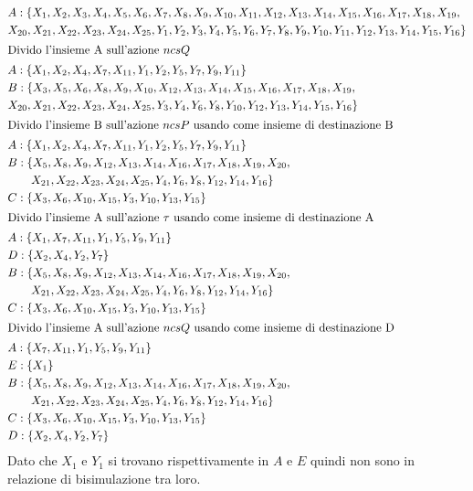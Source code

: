 \documentclass[a4paper]{article}
\begin{document}
\begin{align*}
	&A : \{X_1,X_2,X_3,X_4,X_5,X_6,X_7,X_8,X_9,X_{10},X_{11},X_{12},X_{13},X_{14},X_{15},X_{16},X_{17},X_{18},X_{19},
     \\ &X_{20},X_{21},X_{22},X_{23},X_{24},X_{25},Y_1,Y_2,Y_3,Y_4,Y_5,Y_6,Y_7,Y_8,Y_9,Y_{10},Y_{11},Y_{12},Y_{13},Y_{14},Y_{15},Y_{16}\}\\
     \intertext{Divido l'insieme A sull'azione $ncsQ$}
	&A: \{X_1,X_2,X_4,X_7,X_{11},Y_1,Y_2,Y_5,Y_7,Y_9,Y_{11}\}\\
	&B: \{X_3,X_5,X_6,X_8,X_9,X_{10},X_{12},X_{13},X_{14},X_{15},X_{16},X_{17},X_{18},X_{19},\\&X_{20},X_{21},X_{22},X_{23},X_{24},X_{25},Y_3,Y_4,Y_6,Y_8,Y_{10},Y_{12},Y_{13},Y_{14},Y_{15},Y_{16}\}\\
     \intertext{Divido l'insieme B sull'azione $ncsP$ usando come insieme di destinazione B}
	&A: \{X_1,X_2,X_4,X_7,X_{11},Y_1,Y_2,Y_5,Y_7,Y_9,Y_{11}\}\\
	&B: \{X_5,X_8,X_9,X_{12},X_{13},X_{14},X_{16},X_{17},X_{18},X_{19},X_{20},\\& \qquad X_{21},X_{22},X_{23},X_{24},X_{25},Y_4,Y_6,Y_8,Y_{12},Y_{14},Y_{16}\}\\
	&C: \{X_3,X_6,X_{10},X_{15},Y_3,Y_{10},Y_{13},Y_{15} \}\\
     \intertext{Divido l'insieme A sull'azione $\tau$ usando come insieme di destinazione A}
	&A: \{X_1,X_7,X_{11},Y_1,Y_5,Y_9,Y_{11}\}\\
	&D: \{X_2,X_4,Y_2,Y_7\}\\
	&B: \{X_5,X_8,X_9,X_{12},X_{13},X_{14},X_{16},X_{17},X_{18},X_{19},X_{20},\\& \qquad X_{21},X_{22},X_{23},X_{24},X_{25},Y_4,Y_6,Y_8,Y_{12},Y_{14},Y_{16}\}\\
	&C: \{X_3,X_6,X_{10},X_{15},Y_3,Y_{10},Y_{13},Y_{15} \}\\
     \intertext{Divido l'insieme A sull'azione $ncsQ$ usando come insieme di destinazione D}
	&A: \{X_7,X_{11},Y_1,Y_5,Y_9,Y_{11}\}\\
	&E: \{X_1\}\\
	&B: \{X_5,X_8,X_9,X_{12},X_{13},X_{14},X_{16},X_{17},X_{18},X_{19},X_{20},\\& \qquad X_{21},X_{22},X_{23},X_{24},X_{25},Y_4,Y_6,Y_8,Y_{12},Y_{14},Y_{16}\}\\
	&C: \{X_3,X_6,X_{10},X_{15},Y_3,Y_{10},Y_{13},Y_{15} \}\\
	&D: \{X_2,X_4,Y_2,Y_7\}\\
\end{align*}
Dato che $X_1$ e $Y_1$ si trovano rispettivamente in $A$ e $E$ quindi non sono in relazione di bisimulazione tra loro.
\newpage
\end{document}
